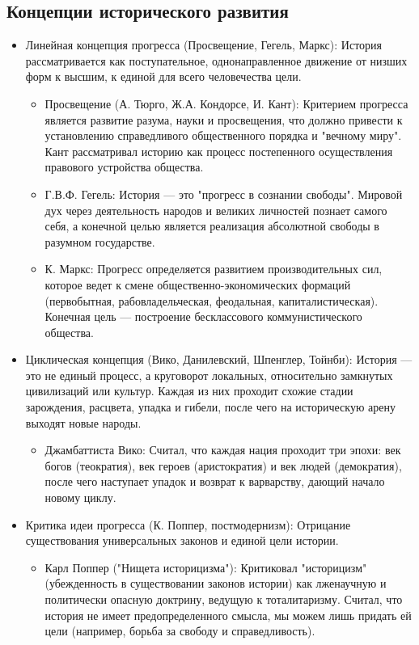 \documentclass[12pt,a4paper]{article}
\begin{document}
	\subsection{Концепции исторического развития}
	\begin{itemize}
		\item Линейная концепция прогресса (Просвещение, Гегель, Маркс): История рассматривается как поступательное, однонаправленное движение от низших форм к высшим, к единой для всего человечества цели.
		\begin{itemize}
			\item Просвещение (А. Тюрго, Ж.А. Кондорсе, И. Кант): Критерием прогресса является развитие разума, науки и просвещения, что должно привести к установлению справедливого общественного порядка и "вечному миру". Кант рассматривал историю как процесс постепенного осуществления правового устройства общества.
			\item Г.В.Ф. Гегель: История --- это "прогресс в сознании свободы". Мировой дух через деятельность народов и великих личностей познает самого себя, а конечной целью является реализация абсолютной свободы в разумном государстве.
			\item К. Маркс: Прогресс определяется развитием производительных сил, которое ведет к смене общественно-экономических формаций (первобытная, рабовладельческая, феодальная, капиталистическая). Конечная цель --- построение бесклассового коммунистического общества.
		\end{itemize}
		\item Циклическая концепция (Вико, Данилевский, Шпенглер, Тойнби): История --- это не единый процесс, а круговорот локальных, относительно замкнутых цивилизаций или культур. Каждая из них проходит схожие стадии зарождения, расцвета, упадка и гибели, после чего на историческую арену выходят новые народы.
		\begin{itemize}
			\item Джамбаттиста Вико: Считал, что каждая нация проходит три эпохи: век богов (теократия), век героев (аристократия) и век людей (демократия), после чего наступает упадок и возврат к варварству, дающий начало новому циклу.
		\end{itemize}
		\item Критика идеи прогресса (К. Поппер, постмодернизм): Отрицание существования универсальных законов и единой цели истории.
		\begin{itemize}
			\item Карл Поппер ("Нищета историцизма"): Критиковал "историцизм" (убежденность в существовании законов истории) как лженаучную и политически опасную доктрину, ведущую к тоталитаризму. Считал, что история не имеет предопределенного смысла, мы можем лишь придать ей цели (например, борьба за свободу и справедливость).

\end{itemize}
\end{itemize}
\end{document}
